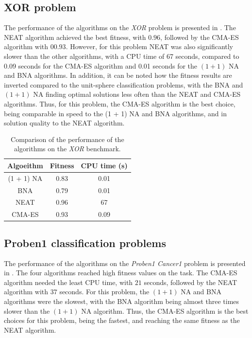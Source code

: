 \subsection{XOR problem}

The performance of the algorithms on the \textit{XOR} problem is presented in .
The NEAT algorithm achieved the best fitness, with $0.96$, followed by the CMA-ES algorithm with $00.93$. However, for this problem NEAT was also significantly slower than the other algorithms,
with a CPU time of 67 seconds, compared to 0.09 seconds for the CMA-ES algorithm and 0.01 seconds for the $(1 + 1)$ NA and BNA algorithms.
In addition, it can be noted how the fitness results are inverted compared to the unit-sphere classification problems, with the BNA and $(1 + 1)$ NA finding optimal solutions less often
than the NEAT and CMA-ES algorithms.
Thus, for this problem, the CMA-ES algorithm is the best choice, being comparable in speed to the (1 + 1) NA and BNA algorithms, and in solution quality to the NEAT algorithm.

\begin{table}
    \caption{Comparison of the performance of the algorithms on the \textit{XOR} benchmark.}
    \label{tab:comparison_xor}
    \centering
    \begin{tabular}{ |c|c|c| }
        \hline
        Algoeithm & Fitness & CPU time (s) \\
        \hline
        (1 + 1) NA & 0.83 & 0.01 \\
        \hline
        BNA & 0.79 & 0.01 \\
        \hline
        NEAT & 0.96 & 67 \\
        \hline
        CMA-ES & 0.93 & 0.09 \\
        \hline\hline
    \end{tabular}
\end{table}

\subsection{Proben1 classification problems}

The performance of the algorithms on the \textit{Proben1 Cancer1} problem is presented in .
The four algorithms reached high fitness values on the task. The CMA-ES algorithm needed the least CPU time, with $21$ seconds, followed by the NEAT algorithm with $37$ seconds.
For this problem, the $(1 + 1)$ NA and BNA algorithms were the slowest, with the BNA algorithm being almost three times slower than the $(1 + 1)$ NA algorithm.
Thus, the CMA-ES algorithm is the best choices for this problem, being the fastest, and reaching the same fitness as the NEAT algorithm.

